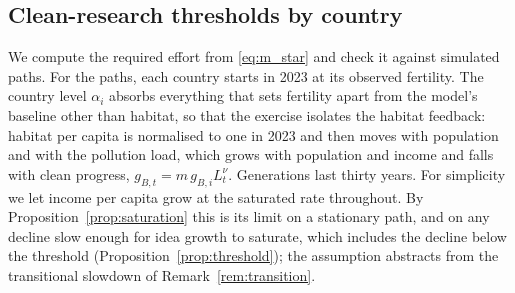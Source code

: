 \documentclass[11pt]{article}
\begin{document}
\subsection{Clean-research thresholds by country}
\label{sub:proj}
We compute the required effort from \eqref{eq:m_star} and check it against simulated paths. For the
paths, each country starts in 2023 at its observed fertility. The country level $\alpha_i$
absorbs everything that sets fertility apart from the model's baseline other than habitat, so that the
exercise isolates the habitat feedback: habitat per capita is normalised to one in 2023 and then moves
with population and with the pollution load, which grows with population and income and falls with
clean progress, $g_{B,t}=m\,g_{B,i}L_t^{\nu}$. Generations last thirty years. For simplicity we let income
per capita grow at the saturated rate throughout. By Proposition~\ref{prop:saturation} this is its limit
on a stationary path, and on any decline slow enough for idea growth to saturate, which includes the
decline below the threshold (Proposition~\ref{prop:threshold}); the assumption abstracts from the
transitional slowdown of Remark~\ref{rem:transition}.
\end{document}
